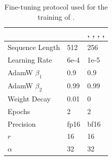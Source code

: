 \begin{table}[H]
    \caption{Fine-tuning protocol used for the training of \ourmethodshort{}.}
    \centering 
    \footnotesize
    \renewcommand{\arraystretch}{0.5}
    \begin{tabularx}{0.99\textwidth}{M|x|x}
    \toprule
    & 
    \bfseries \gpt{} & 
    \bfseries \llamaTwoSmall{}, \llamaTwoBig{}, \qwenSmall{}, \qwenMedium{}, \qwenLarge{} \\
    \midrule
    Sequence Length & 512 & 256 \\ 
    \midrule
    Learning Rate & 6e-4 & 1e-5 \\
    \midrule
    AdamW $\beta_1$ & 0.9 & 0.9 \\
    \midrule
    AdamW $\beta_2$ & 0.99 & 0.99 \\
    \midrule
    Weight Decay & 0.01 & 0 \\
    \midrule
    Epochs & 2 & 2 \\
    \midrule
    Precision & fp16 & bf16 \\
    \midrule
    \lora{} $r$ & 16 & 16 \\
    \midrule
    \lora{} $\alpha$ & 32 &  32\\
    \bottomrule
\end{tabularx}
\label{tab:training_protocol}
\end{table}
